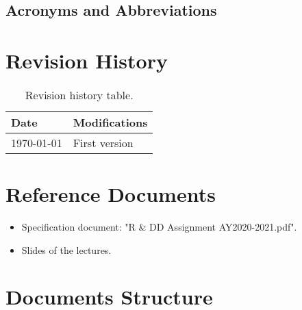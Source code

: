 \subsection{Acronyms and Abbreviations}
\printglossary

\section{Revision History}

\begin{table}[H]
\centering
\begin{tabular}{ m{} | m{} } 
	 \textbf{Date} & \textbf{Modifications} \\
	\hline
	\today & First version \\
\end{tabular}
\caption{Revision history table.}
\label{table:revisionHistory}
\end{table}

\section{Reference Documents}

\begin{itemize}
	\item Specification document: "R \& DD Assignment AY2020-2021.pdf".
	\item Slides of the lectures.
\end{itemize}

\section{Documents Structure}

